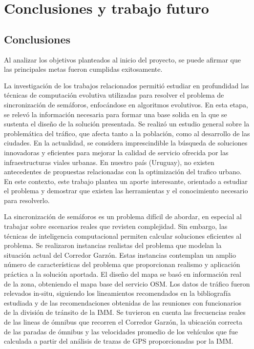 \chapter{Conclusiones y trabajo futuro}

\section{Conclusiones}
Al analizar los objetivos planteados al inicio del proyecto, se puede afirmar que las principales metas fueron cumplidas exitosamente.

La investigación de los trabajos relacionados permitió estudiar en profundidad las técnicas de computación evolutiva utilizadas para resolver el problema de sincronización de semáforos, enfocándose en algoritmos evolutivos. En esta etapa, se relevó la información necesaria para formar una base solida en la que se sustenta el diseño de la solución presentada. Se realizó un estudio general sobre la problemática del tráfico, que afecta tanto a la población, como al desarrollo de las ciudades. En la actualidad, se considera imprescindible la búsqueda de soluciones innovadoras y eficientes para mejorar la calidad de servicio ofrecida por las infraestructuras viales urbanas. En nuestro país (Uruguay), no existen antecedentes de propuestas relacionadas con la optimización del trafico urbano. En este contexto, este trabajo plantea un aporte interesante, orientado a estudiar el problema y demostrar que existen las herramientas y el conocimiento necesario para resolverlo.

La sincronización de semáforos es un problema difícil de abordar, en especial al trabajar sobre escenarios reales que revisten complejidad. Sin embargo, las técnicas de inteligencia computacional permiten calcular soluciones eficientes al problema. Se realizaron instancias realistas del problema que modelan la situación actual del Corredor Garzón. Estas instancias contemplan un amplio número de características del problema que proporcionan realismo y aplicación práctica a la solución aportada. El diseño del mapa se basó en información real de la zona, obteniendo el mapa base del servicio OSM. Los datos de tráfico fueron relevados in-situ, siguiendo los lineamientos recomendados en la bibliografía estudiada y de las recomendaciones obtenidas de las reuniones con funcionarios de la división de tránsito de la IMM. Se tuvieron en cuenta las frecuencias reales de las lineas de ómnibus que recorren el Corredor Garzón,  la ubicación correcta de las paradas de ómnibus y las velocidades promedio de los vehículos que fue calculada a partir del análisis de trazas de GPS proporcionadas por la IMM.
 
